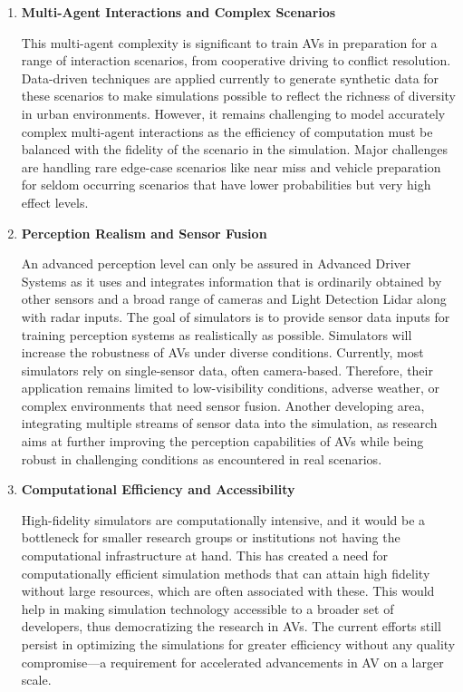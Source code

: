 \documentclass[lettersize,journal]{IEEEtran}
\begin{document}
\begin{enumerate}
    \item \textbf{Multi-Agent Interactions and Complex Scenarios}

    This multi-agent complexity is significant to train AVs in preparation for a range of interaction scenarios, from cooperative driving to conflict resolution. Data-driven techniques are applied currently to generate synthetic data for these scenarios to make simulations possible to reflect the richness of diversity in urban environments. However, it remains challenging to model accurately complex multi-agent interactions as the efficiency of computation must be balanced with the fidelity of the scenario in the simulation. Major challenges are handling rare edge-case scenarios like near miss and vehicle preparation for seldom occurring scenarios that have lower probabilities but very high effect levels.

    \item \textbf{Perception Realism and Sensor Fusion}

    An advanced perception level can only be assured in Advanced Driver Systems as it uses and integrates information that is ordinarily obtained by other sensors and a broad range of cameras and Light Detection Lidar along with radar inputs. The goal of simulators is to provide sensor data inputs for training perception systems as realistically as possible. Simulators will increase the robustness of AVs under diverse conditions. Currently, most simulators rely on single-sensor data, often camera-based. Therefore, their application remains limited to low-visibility conditions, adverse weather, or complex environments that need sensor fusion. Another developing area, integrating multiple streams of sensor data into the simulation, as research aims at further improving the perception capabilities of AVs while being robust in challenging conditions as encountered in real scenarios.

    \item \textbf{Computational Efficiency and Accessibility}

    High-fidelity simulators are computationally intensive, and it would be a bottleneck for smaller research groups or institutions not having the computational infrastructure at hand. This has created a need for computationally efficient simulation methods that can attain high fidelity without large resources, which are often associated with these. This would help in making simulation technology accessible to a broader set of developers, thus democratizing the research in AVs. The current efforts still persist in optimizing the simulations for greater efficiency without any quality compromise—a requirement for accelerated advancements in AV on a larger scale.
\end{enumerate}
\end{document}
